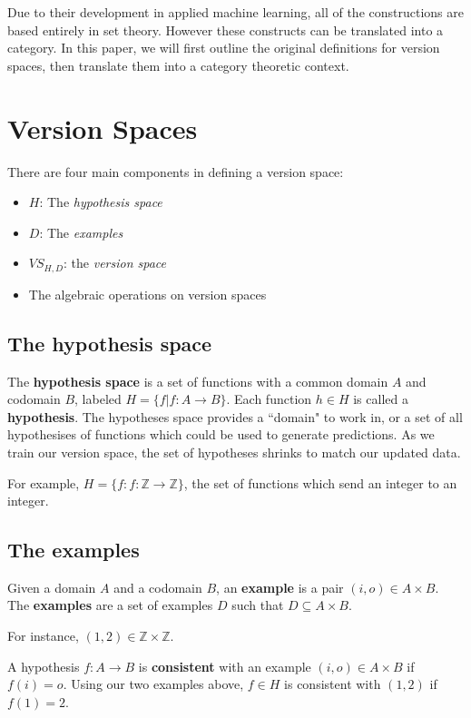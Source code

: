 \documentclass{article}
\theoremstyle{definition}
\begin{document}
Due to their development in applied machine learning, all of the constructions are based entirely in set theory. However these constructs can be translated into a category. In this paper, we will first outline the original definitions for version spaces, then translate them into a category theoretic context. 

\section{Version Spaces}
There are four main components in defining a version space: 
\begin{itemize}
    \item $H$: The \textit{hypothesis space}
    \item $D$: The \textit{examples}
    \item $VS_{H,D}$: the \textit{version space}
    \item The algebraic operations on version spaces
\end{itemize}


\subsection{The hypothesis space}

The \textbf{hypothesis space} is a set of functions with a common domain $A$ and codomain $B$, labeled $H = \{f | f: A \rightarrow B \}$. Each function $h \in H$ is called a \textbf{hypothesis}.  The hypotheses space provides a ``domain" to work in, or a set of all hypothesises of functions which could be used to generate predictions. As we train our version space, the set of hypotheses shrinks to match our updated data. 

For example, $H = \{f: f: \mathbb{Z} \rightarrow \mathbb{Z}\}$, the set of functions which send an integer to an integer. 

\subsection{The examples}
Given a domain $A$ and a codomain $B$, an \textbf{example} is a pair $(i, o)\in A \times B$. The \textbf{examples} are a set of examples $D$ such that $D \subseteq A \times B$. 

For instance, $(1,2) \in \mathbb{Z} \times \mathbb{Z}$. 

A hypothesis $f: A\rightarrow B$ is \textbf{consistent} with an example $(i,o) \in A\times B$ if $f(i) = o$. Using our two examples above, $f\in H $ is consistent with $(1,2)$ if $f(1) = 2$. 
\end{document}
